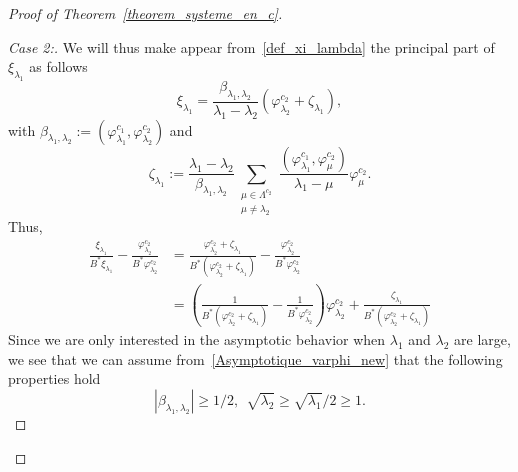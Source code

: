 \documentclass[AHL,Unicode,longabstracts]{cedram}
\newenvironment{step}[1]{\begin{proof}[#1]}{\let\qed\relax\end{proof}}
\newcommand{\fprop}[2]{\varphi^{#1}_{#2}}
\begin{document}
\begin{proof}[Proof of Theorem~\ref{theorem_systeme_en_c}]
\begin{step}{Case 2:}
We will thus make appear from~\eqref{def_xi_lambda} the principal part of $\xi_{\lambda_1}$ as follows
\[
\xi_{\lambda_1} = \frac{\beta_{\lambda_1,\lambda_2}}{\lambda_1-\lambda_2} \left(\fprop{c_2}{\lambda_2} + \zeta_{\lambda_1}\right),
\]
with $\beta_{\lambda_1,\lambda_2} := (\fprop{c_1}{\lambda_1},\fprop{c_2}{\lambda_2})$ and
\[
\zeta_{\lambda_1} := \frac{\lambda_1-\lambda_2}{\beta_{\lambda_1,\lambda_2}} \sum_{\substack{\mu\in \Lambda^{c_2}\\ \mu\neq\lambda_2}} \frac{\left(\fprop{c_1}{\lambda_1},\fprop{c_2}{\mu}\right)}{\lambda_1-\mu} \fprop{c_2}{\mu}.
\]
Thus,
\begin{equation}\label{MiseEnValeurCompensation}
\begin{aligned}
\frac{\xi_{\lambda_1}}{B^* \xi_{\lambda_1}} - \frac{\fprop{c_2}{\lambda_2}}{B^* \fprop{c_2}{\lambda_2}} &=
\frac{\fprop{c_2}{\lambda_2}+\zeta_{\lambda_1}}{B^*(\fprop{c_2}{\lambda_2}+\zeta_{\lambda_1}) } - \frac{\fprop{c_2}{\lambda_2}}{B^* \fprop{c_2}{\lambda_2}}
\\
&= \left(\frac{1}{B^* (\fprop{c_2}{\lambda_2}+\zeta_{\lambda_1})} - \frac{1}{B^* \fprop{c_2}{\lambda_2}} \right) \fprop{c_2}{\lambda_2} + \frac{\zeta_{\lambda_1}}{B^* \left(\fprop{c_2}{\lambda_2}+\zeta_{\lambda_1}\right)}
\end{aligned}
\end{equation}
Since we are only interested in the asymptotic behavior when $\lambda_1$ and $\lambda_2$ are large, we see that we can assume from~\eqref{Asymptotique_varphi_new} that the following properties hold
\begin{equation}\label{lambda_est_grand}
|\beta_{\lambda_1,\lambda_2}| \geq 1/2, \ \ \sqrt{\lambda_2}\geq \sqrt{\lambda_1}/2\geq 1.
\end{equation}


\end{step}
\end{proof}
\end{document}
